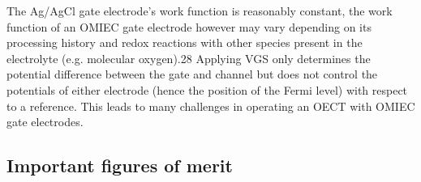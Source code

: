 The Ag/AgCl gate electrode’s work function is reasonably constant, the work function of an OMIEC gate electrode however may vary depending on its processing history and redox reactions with other species present in the electrolyte (e.g. molecular oxygen).28 Applying VGS only determines the potential difference between the gate and channel but does not control the potentials of either electrode (hence the position of the Fermi level) with respect to a reference. This leads to many challenges in operating an OECT with OMIEC gate electrodes.


\subsection{Important figures of merit}



